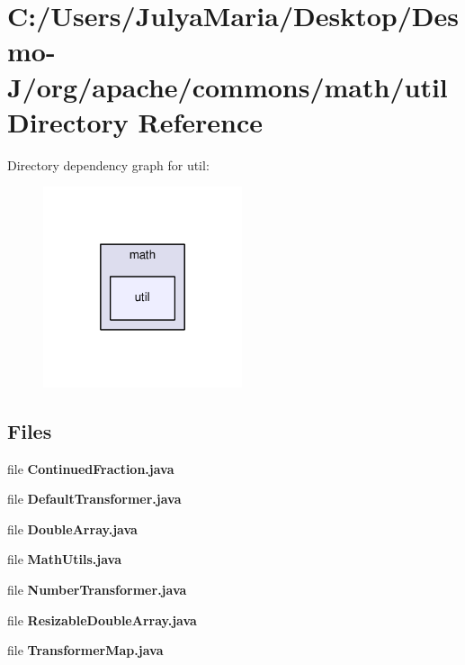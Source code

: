 \section{C\-:/\-Users/\-Julya\-Maria/\-Desktop/\-Desmo-\/\-J/org/apache/commons/math/util Directory Reference}
\label{dir_371c957c1dd64c0b4214289995420dc6}
Directory dependency graph for util\-:
\nopagebreak
\begin{figure}[H]
\begin{center}
\leavevmode
\includegraphics[width=166pt]{dir_371c957c1dd64c0b4214289995420dc6_dep}
\end{center}
\end{figure}
\subsection*{Files}
\begin{DoxyCompactItemize}
\item 
file {\bfseries Continued\-Fraction.\-java}
\item 
file {\bfseries Default\-Transformer.\-java}
\item 
file {\bfseries Double\-Array.\-java}
\item 
file {\bfseries Math\-Utils.\-java}
\item 
file {\bfseries Number\-Transformer.\-java}
\item 
file {\bfseries Resizable\-Double\-Array.\-java}
\item 
file {\bfseries Transformer\-Map.\-java}
\end{DoxyCompactItemize}
